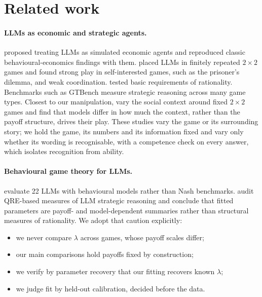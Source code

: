 \documentclass[11pt]{article}
\theoremstyle{definition}
\theoremstyle{remark}
\newcommand{\lam}{\lambda}
\begin{document}
\section{Related work}\label{sec:related}

\paragraph{LLMs as economic and strategic agents.} \citet{horton2023homo} proposed treating LLMs
as simulated economic agents and reproduced classic behavioural-economics findings with them.
\citet{akata2025repeated} placed LLMs in finitely repeated $2\times2$ games and found strong play
in self-interested games, such as the prisoner's dilemma, and weak coordination.
\citet{fan2024rational} tested basic requirements of rationality. Benchmarks such as GTBench
\citep{duan2024gtbench} measure strategic reasoning across many game types. Closest to our
manipulation, \citet{lore2024strategic} vary the social context around fixed $2\times2$ games and
find that models differ in how much the context, rather than the payoff structure, drives
their play. These studies vary the game or its surrounding story; we hold the game, its numbers
and its information fixed and vary only whether its wording is recognisable, with a competence
check on every answer, which isolates recognition from ability.

\paragraph{Behavioural game theory for LLMs.} \citet{jia2025behavioral} evaluate 22 LLMs with
behavioural models rather than Nash benchmarks. \citet{pechon2026auditing} audit QRE-based
measures of LLM strategic reasoning and conclude that fitted parameters are payoff- and
model-dependent summaries rather than structural measures of rationality. We adopt that caution
explicitly:
\begin{itemize}
\item we never compare $\lam$ across games, whose payoff scales differ;
\item our main comparisons hold payoffs fixed by construction;
\item we verify by parameter recovery that our fitting recovers known $\lam$;
\item we judge fit by held-out calibration, decided before the data.
\end{itemize}
\end{document}
